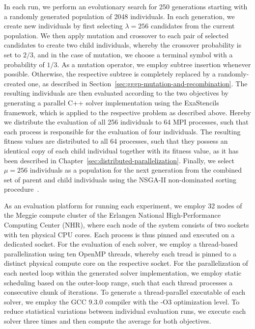 In each run, we perform an evolutionary search for 250 generations starting with a randomly generated population of 2048 individuals.
In each generation, we create new individuals by first selecting $\lambda = 256$ candidates from the current population.
We then apply mutation and crossover to each pair of selected candidates to create two child individuals, whereby the crossover probability is set to $2/3$, and in the case of mutation, we choose a terminal symbol with a probability of $1/3$.
As a mutation operator, we employ subtree insertion whenever possible. Otherwise, the respective subtree is completely replaced by a randomly-created one, as described in Section~\ref{sec:gggp-mutation-and-recombination}.
The resulting individuals are then evaluated according to the two objectives by generating a parallel C++ solver implementation using the ExaStencils framework, which is applied to the respective problem as described above.
Hereby we distribute the evaluation of all 256 individuals to 64 MPI processes, such that each process is responsible for the evaluation of four individuals.
The resulting fitness values are distributed to all 64 processes, such that they possess an identical copy of each child individual together with its fitness value, as it has been described in Chapter~\ref{sec:distributed-parallelization}.
Finally, we select $\mu = 256$ individuals as a population for the next generation from the combined set of parent and child individuals using the NSGA-II non-dominated sorting procedure~\cite{deb2002fast}.

As an evaluation platform for running each experiment, we employ 32 nodes of the Meggie compute cluster of the Erlangen National High-Performance Computing Center (NHR), where each node of the system consists of two sockets with ten physical CPU cores.
Each process is thus pinned and executed on a dedicated socket. 
For the evaluation of each solver, we employ a thread-based parallelization using ten OpenMP threads, whereby each tread is pinned to a distinct physical compute core on the respective socket.
For the parallelization of each nested loop within the generated solver implementation, we employ static scheduling based on the outer-loop range, such that each thread processes a consecutive chunk of iterations.
To generate a thread-parallel executable of each solver, we employ the GCC 9.3.0 compiler with the -O3 optimization level.
To reduce statistical variations between individual evaluation runs, we execute each solver three times and then compute the average for both objectives.

